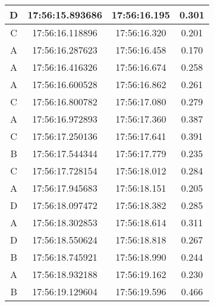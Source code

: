 \begin{longtable}{|ccc|c|}
  \multicolumn{1}{|c|}{D}    & \multicolumn{1}{c|}{17:56:15.893686} & 17:56:16.195       & 0.301        \\ \hline
  \multicolumn{1}{|c|}{C}    & \multicolumn{1}{c|}{17:56:16.118896} & 17:56:16.320       & 0.201        \\ \hline
  \multicolumn{1}{|c|}{A}    & \multicolumn{1}{c|}{17:56:16.287623} & 17:56:16.458       & 0.170        \\ \hline
  \multicolumn{1}{|c|}{A}    & \multicolumn{1}{c|}{17:56:16.416326} & 17:56:16.674       & 0.258        \\ \hline
  \multicolumn{1}{|c|}{A}    & \multicolumn{1}{c|}{17:56:16.600528} & 17:56:16.862       & 0.261        \\ \hline
  \multicolumn{1}{|c|}{C}    & \multicolumn{1}{c|}{17:56:16.800782} & 17:56:17.080       & 0.279        \\ \hline
  \multicolumn{1}{|c|}{A}    & \multicolumn{1}{c|}{17:56:16.972893} & 17:56:17.360       & 0.387        \\ \hline
  \multicolumn{1}{|c|}{C}    & \multicolumn{1}{c|}{17:56:17.250136} & 17:56:17.641       & 0.391        \\ \hline
  \multicolumn{1}{|c|}{B}    & \multicolumn{1}{c|}{17:56:17.544344} & 17:56:17.779       & 0.235        \\ \hline
  \multicolumn{1}{|c|}{C}    & \multicolumn{1}{c|}{17:56:17.728154} & 17:56:18.012       & 0.284        \\ \hline
  \multicolumn{1}{|c|}{A}    & \multicolumn{1}{c|}{17:56:17.945683} & 17:56:18.151       & 0.205        \\ \hline
  \multicolumn{1}{|c|}{D}    & \multicolumn{1}{c|}{17:56:18.097472} & 17:56:18.382       & 0.285        \\ \hline
  \multicolumn{1}{|c|}{A}    & \multicolumn{1}{c|}{17:56:18.302853} & 17:56:18.614       & 0.311        \\ \hline
  \multicolumn{1}{|c|}{D}    & \multicolumn{1}{c|}{17:56:18.550624} & 17:56:18.818       & 0.267        \\ \hline
  \multicolumn{1}{|c|}{B}    & \multicolumn{1}{c|}{17:56:18.745921} & 17:56:18.990       & 0.244        \\ \hline
  \multicolumn{1}{|c|}{A}    & \multicolumn{1}{c|}{17:56:18.932188} & 17:56:19.162       & 0.230        \\ \hline
  \multicolumn{1}{|c|}{B}    & \multicolumn{1}{c|}{17:56:19.129604} & 17:56:19.596       & 0.466        \\ \hline

\end{longtable}
